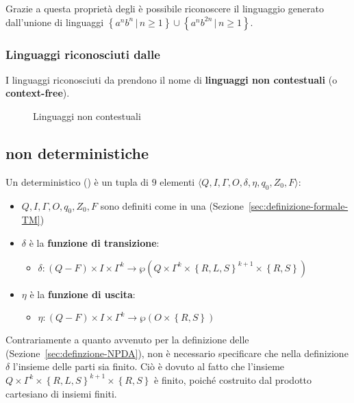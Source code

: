 \documentclass[italian, 10pt]{article}
\begin{document}
Grazie a questa proprietà degli \NPDA è possibile riconoscere il linguaggio generato dall'unione di linguaggi \(\left\{a^n b^n \, | \, n \geq 1\right\} \cup \left\{a^n b^{2n} \, | \, n \geq 1\right\}\).

\subsubsection{Linguaggi riconosciuti dalle \NPDA}

I linguaggi riconosciuti da \NPDA prendono il nome di \textbf{linguaggi non contestuali} (o \textbf{context-free}).

\begin{figure}[htbp]
  \bigskip
  \centering
  \caption{Linguaggi non contestuali}
  \label{fig:linguaggi-non-contestuali}
  \bigskip
\end{figure}

\subsection{\TM non deterministiche}
\label{sec:TM-non-deterministiche}

Un \TM deterministico (\NTM) è un tupla di \(9\) elementi \(\langle Q, I, \Gamma, O, \delta, \eta, q_0, Z_0, F \rangle\):

\begin{itemize}
  \item \(Q, I, \Gamma, O, q_0, Z_0, F\) sono definiti come in una \TM (Sezione~\ref{sec:definizione-formale-TM})
  \item \(\delta\) è la \textbf{funzione di transizione}:
        \begin{itemize}
          \item \(\delta: (Q - F) \times I \times \Gamma^k \rightarrow \wp\left(Q \times \Gamma^k \times \left\{R, L, S\right\}^{k+1} \times \left\{R, S \right\} \right)\)
        \end{itemize}
  \item \(\eta\) è la \textbf{funzione di uscita}:
        \begin{itemize}
          \item \(\eta : (Q - F) \times I \times \Gamma^k \rightarrow \wp\left(O \times \left\{R, S\right\}\right)\)
        \end{itemize}
\end{itemize}

\bigskip
Contrariamente a quanto avvenuto per la definizione delle \NPDA (Sezione~\ref{sec:definzione-NPDA}), non è necessario specificare che nella definizione \(\delta\) l'insieme delle parti sia finito.
Ciò è dovuto al fatto che l'insieme \(Q \times \Gamma^k \times \left\{R, L, S\right\}^{k+1} \times \left\{R, S \right\}\) è finito, poiché costruito dal prodotto cartesiano di insiemi finiti.
\end{document}
